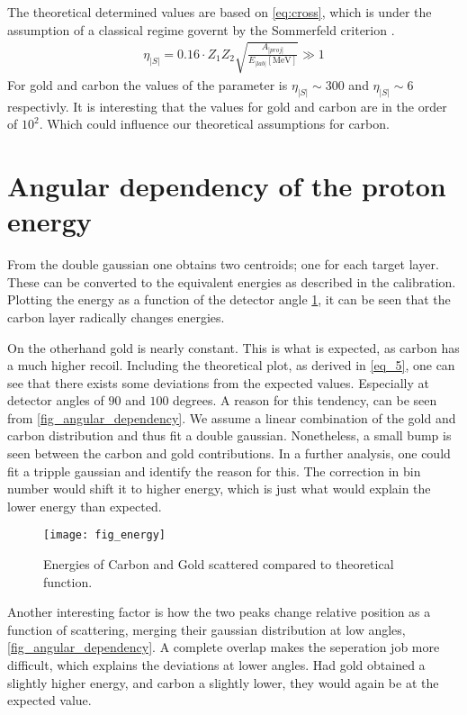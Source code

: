 The theoretical determined values are based on \cref{eq:cross}, which is under the assumption of a classical regime governt by the Sommerfeld criterion \parencite[p. 14]{noteBB}.
\begin{align}\label{eq:som}
\eta_|S|=0.16\cdot Z_1Z_2\sqrt{\frac{A_|proj|}{E_|lab|[\si{\mega\electronvolt}]}}\gg 1
\end{align}
For gold and carbon the values of the parameter is $\eta_|S|\sim 300$ and
$\eta_|S|\sim 6$ respectivly. It is interesting that the values for gold and carbon are in the order of $10^2$. Which could influence our theoretical assumptions for carbon. 

\section{Angular dependency of the proton energy}
From the double gaussian one obtains two centroids; one for each target layer.
These can be converted to the equivalent energies as described in the
calibration. Plotting the energy as a function of the detector angle
\cref{fig_energy}, it can be seen that the carbon layer radically changes
energies.

On the otherhand gold is nearly constant. This is what is expected, as carbon
has a much higher recoil. Including the theoretical plot, as derived in
\cref{eq_5}, one can see that there exists some deviations from the expected
values. Especially at detector angles of $90$ and $100$ degrees.
A reason for this tendency, can be seen from \cref{fig_angular_dependency}. We
assume a linear combination of the gold and carbon distribution and thus fit a
double gaussian. Nonetheless, a small bump is seen between the carbon and gold
contributions. In a further analysis, one could fit a tripple gaussian and
identify the reason for this. The correction in bin number would shift it to
higher energy, which is just what would explain the lower energy than
expected.

\begin{figure}[t]
\centering
\texttt{[image: fig\_energy]}
\caption{Energies of Carbon and Gold scattered compared to theoretical
function.}
\label{fig_energy}
\end{figure}
Another interesting factor is how the two peaks change relative position as a
function of scattering, merging their gaussian distribution at low angles, \cref{fig_angular_dependency}. A complete overlap makes the seperation job more difficult, which explains the deviations at lower angles. Had gold obtained a slightly higher energy, and carbon a slightly lower, they would again be at the expected value.



